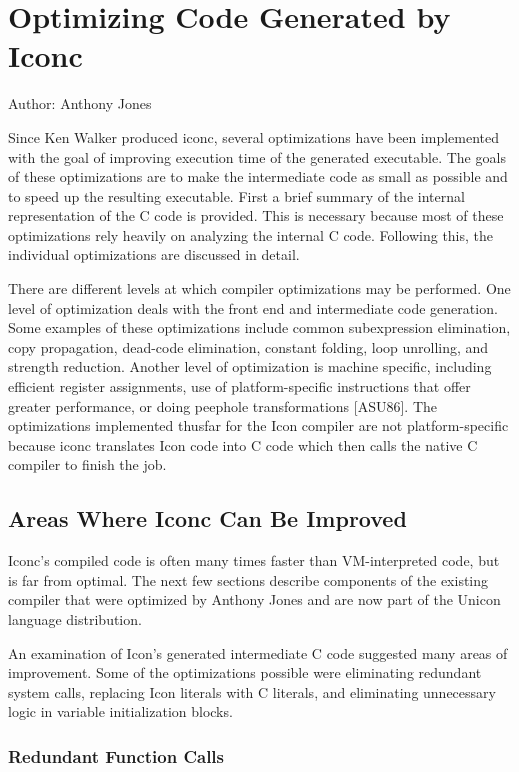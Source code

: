 \chapter{Optimizing Code Generated by Iconc}

Author: Anthony Jones

Since Ken Walker produced iconc, several optimizations have been
implemented with the goal of improving execution time of the generated
executable. The goals of these optimizations are to make the
intermediate code as small as possible and to speed up the resulting
executable. First a brief summary of the internal representation of
the C code is provided. This is necessary because most of these
optimizations rely heavily on analyzing the internal C code. Following
this, the individual optimizations are discussed in detail.

There are different levels at which compiler optimizations may be
performed. One level of optimization deals with the front end and
intermediate code generation. Some examples of these optimizations
include common subexpression elimination, copy propagation, dead-code
elimination, constant folding, loop unrolling, and strength reduction.
Another level of optimization is machine specific, including efficient
register assignments, use of platform-specific instructions that offer
greater performance, or doing peephole transformations [ASU86]. The
optimizations implemented thusfar for the Icon compiler are not
platform-specific because iconc translates Icon code into C code which
then calls the native C compiler to finish the job.



\section{Areas Where Iconc Can Be Improved}

Iconc's compiled code is often many times faster than VM-interpreted
code, but is far from optimal. The next few sections describe
components of the existing compiler that were optimized by Anthony
Jones and are now part of the Unicon language distribution.

An examination of Icon's generated intermediate C code suggested many
areas of improvement. Some of the optimizations possible were
eliminating redundant system calls, replacing Icon literals with C
literals, and eliminating unnecessary logic in variable initialization
blocks.

\subsection{Redundant Function Calls}

